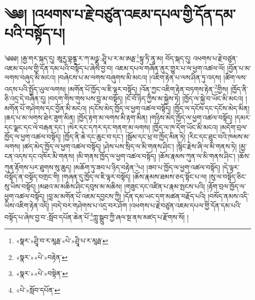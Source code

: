 \chapter{༄༅། །འཕགས་པ་རྗེ་བཙུན་འཇམ་དཔལ་གྱི་དོན་དམ་པའི་བསྟོད་པ།}༄༅༅། །རྒྱ་གར་སྐད་དུ། ཨཱརྱ་བྷནྚཱ་ར་ཀ་མཉྫུ་:ཤྲཱི་པ་ར་མ་ཨརྠ་\footnote{«སྣར་»ཤྲཱི་བ་ར་མཱརྠ་«པེ་»ཤྲཱི་པ་ར་མཱརྠ་}སྟུ་ཏི་ནཱ་མ། བོད་སྐད་དུ། འཕགས་པ་རྗེ་བཙུན་འཇམ་དཔལ་གྱི་དོན་དམ་པའི་བསྟོད་པ་ཞེས་བྱ་བ། འཇམ་དཔལ་གཞོན་ནུར་གྱུར་པ་ལ་ཕྱག་འཚལ་ལོ། །བྱོན་པ་མ་ལགས་བཞུད་མི་མངའ། །བཞེངས་པ་མ་ལགས་བཞུགས་མི་མངའ། །འཇིག་རྟེན་པ་ལས་ཤིན་ཏུ་འདས། །ཚིག་ལས་འདས་པའི་སྤྱོད་ཡུལ་ལགས། །མགོན་པོ་ཁྱོད་ལ་ཇི་ལྟར་བསྟོད། །འོན་ཀྱང་འཇིག་རྟེན་བཏགས་རྟེན་\footnote{«སྣར་»«པེ་»བརྟེན་}གྱིས། །ཁྱོད་ནི་ཅི་འདྲ་དེ་བཞིན་དུ། །བདག་གིས་གུས་པས་བླ་མ་བསྟོད། །ངོ་བོ་ཉིད་ཀྱིས་མ་སྐྱེས་ཏེ། །ཁྱོད་ལ་སྐྱེ་བ་ཡོང་མི་མངའ། །མགོན་པོ་གཤེགས་དང་བྱོན་མི་མངའ། །དངོས་མེད་ཁྱོད་ལ་ཕྱག་འཚལ་བསྟོད། །ཁྱོད་ལ་དངོས་དང་དངོས་མེད་མིན། །ཆད་པ་མ་ལགས་ཐེར་ཟུག་མིན། །ཁྱོད་རྟག་མ་ལགས་མི་རྟག་མིན། །གཉིས་མེད་ཁྱོད་ལ་ཕྱག་འཚལ་བསྟོད། །དམར་དང་ལྗང་དང་ལེ་བརྒན་དང་། །སེར་དང་དཀར་དང་གནག་མ་ལགས། །ཁྱོད་ལ་ཁ་དོག་ཡོང་མི་མངའ། །མདོག་བྲལ་ཁྱོད་ལ་ཕྱག་འཚལ་བསྟོད། །ཁྱོད་ནི་ཆེ་དང་ཆུང་བ་དང་། །སྦོམ་དང་ཕྲ་བ་ཁྱོད་མིན་ཏེ། །རིང་དང་ཐུང་བའི་ཁམས་མ་ལགས། །ཚད་མེད་ཁྱོད་ལ་ཕྱག་འཚལ་བསྟོད། །ཤེས་པས་སྲིད་ལ་མི་གནས་ཤིང་། །སྙིང་རྗེས་ཞི་ལ་མི་གནས་ཏེ། །མྱ་ངན་འདས་དང་འཁོར་མི་གནས། །མི་གནས་ཁྱོད་ལ་ཕྱག་འཚལ་བསྟོད། །ཆོས་རྣམས་ཀུན་ལ་མི་གནས་ཤིང་། །ཆོས་ཀུན་རྟོགས་པར་ཐུགས་སུ་ཆུད། །མཆོག་ཏུ་ཟབ་པ་ཉིད་བརྟེན་\footnote{«སྣར་»«པེ་»བསྟེན་}པ། །ཟབ་པ་ཁྱོད་ལ་ཕྱག་འཚལ་བསྟོད། །དེ་ལྟར་བསྟོད་ན་བསྟོད་བགྲང་གི། །གཞན་དུ་ཁྱོད་ལ་ཇི་ལྟར་བསྟོད། །ཆོས་རྣམས་ཐམས་ཅད་སྟོང་པ་ལ། །སུ་ལ་བསྟོད་ཅིང་སུ་ཡིས་བསྟོད། །མཐའ་མ་མཆིས་ཤིང་དབུས་མ་མཆིས། །གཟུང་དང་འཛིན་པ་རྣམ་སྤངས་པའི། །རྟོག་བྲལ་ཁྱོད་ལ་ཕྱག་འཚལ་བསྟོད། །བླ་མ་མགོན་པོ་འཇམ་དབྱངས་ཀྱི། །དོན་དམ་ཡང་དག་མཚན་བརྗོད་པའི། །བསོད་ནམས་འདི་ཡིས་འཇིག་རྟེན་འདི། །བདེ་བར་གཤེགས་པ་འདྲ་བར་ཤོག །འཕགས་པ་རྗེ་བཙུན་འཇམ་དཔལ་གྱི་དོན་དམ་པའི་བསྟོད་པ་ཞེས་བྱ་བ་:སློབ་དཔོན་ཆེན་པོ་\footnote{«པེ་»སློབ་དཔོན་}ཀླུ་སྒྲུབ་ཀྱི་ཞལ་སྔ་ནས་མཛད་པ་རྫོགས་སོ། ། 